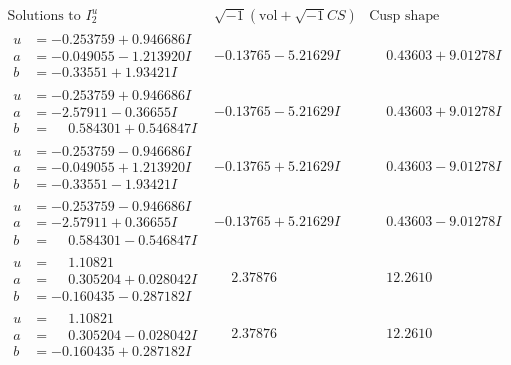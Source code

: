 \documentclass[1p]{elsarticle_modified}
\theoremstyle{definition}
\newcommand{\I}{\sqrt{-1}}
\begin{document}
$$\begin{array}{c|c|c}  
\text{Solutions to }I^u_{2}& \I (\text{vol} + \sqrt{-1}CS) & \text{Cusp shape}\\
 \hline 
\begin{aligned}
u &= -0.253759 + 0.946686 I \\
a &= -0.049055 - 1.213920 I \\
b &= -0.33551 + 1.93421 I\end{aligned}
 & -0.13765 - 5.21629 I & \phantom{-}0.43603 + 9.01278 I \\ \hline\begin{aligned}
u &= -0.253759 + 0.946686 I \\
a &= -2.57911 - 0.36655 I \\
b &= \phantom{-}0.584301 + 0.546847 I\end{aligned}
 & -0.13765 - 5.21629 I & \phantom{-}0.43603 + 9.01278 I \\ \hline\begin{aligned}
u &= -0.253759 - 0.946686 I \\
a &= -0.049055 + 1.213920 I \\
b &= -0.33551 - 1.93421 I\end{aligned}
 & -0.13765 + 5.21629 I & \phantom{-}0.43603 - 9.01278 I \\ \hline\begin{aligned}
u &= -0.253759 - 0.946686 I \\
a &= -2.57911 + 0.36655 I \\
b &= \phantom{-}0.584301 - 0.546847 I\end{aligned}
 & -0.13765 + 5.21629 I & \phantom{-}0.43603 - 9.01278 I \\ \hline\begin{aligned}
u &= \phantom{-}1.10821\phantom{ +0.000000I} \\
a &= \phantom{-}0.305204 + 0.028042 I \\
b &= -0.160435 - 0.287182 I\end{aligned}
 & \phantom{-}2.37876\phantom{ +0.000000I} & \phantom{-}12.2610\phantom{ +0.000000I} \\ \hline\begin{aligned}
u &= \phantom{-}1.10821\phantom{ +0.000000I} \\
a &= \phantom{-}0.305204 - 0.028042 I \\
b &= -0.160435 + 0.287182 I\end{aligned}
 & \phantom{-}2.37876\phantom{ +0.000000I} & \phantom{-}12.2610\phantom{ +0.000000I} \\ \hline\begin{aligned}

\end{aligned}
\end{array}$$
\end{document}
